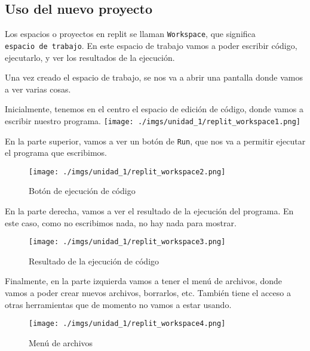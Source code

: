 \documentclass[
  letterpaper,
  DIV=11,
  numbers=noendperiod]{scrreprt}
\begin{document}
\subsection{Uso del nuevo proyecto}\label{uso-del-nuevo-proyecto}

Los espacios o proyectos en replit se llaman \texttt{Workspace}, que
significa \texttt{espacio\ de\ trabajo}. En este espacio de trabajo
vamos a poder escribir código, ejecutarlo, y ver los resultados de la
ejecución.

Una vez creado el espacio de trabajo, se nos va a abrir una pantalla
donde vamos a ver varias cosas.

Inicialmente, tenemos en el centro el espacio de edición de código,
donde vamos a escribir nuestro programa.
\texttt{[image: ./imgs/unidad\_1/replit\_workspace1.png]}

En la parte superior, vamos a ver un botón de \texttt{Run}, que nos va a
permitir ejecutar el programa que escribimos.

\begin{figure}[H]

{\centering \texttt{[image: ./imgs/unidad\_1/replit\_workspace2.png]}

}

\caption{Botón de ejecución de código}

\end{figure}%

En la parte derecha, vamos a ver el resultado de la ejecución del
programa. En este caso, como no escribimos nada, no hay nada para
mostrar.

\begin{figure}[H]

{\centering \texttt{[image: ./imgs/unidad\_1/replit\_workspace3.png]}

}

\caption{Resultado de la ejecución de código}

\end{figure}%

Finalmente, en la parte izquierda vamos a tener el menú de archivos,
donde vamos a poder crear nuevos archivos, borrarlos, etc. También tiene
el acceso a otras herramientas que de momento no vamos a estar usando.

\begin{figure}[H]

{\centering \texttt{[image: ./imgs/unidad\_1/replit\_workspace4.png]}

}

\caption{Menú de archivos}

\end{figure}%
\end{document}
